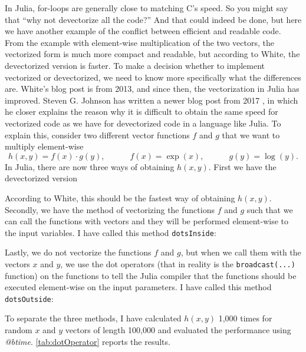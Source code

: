 In Julia, for-loops are generally close to matching C's speed. So you might say that \enquote{why not devectorize all the code?} And that could indeed be done, but here we have another example of the conflict between efficient and readable code. From the example with element-wise multiplication of the two vectors, the vectorized form is much more compact and readable, but according to White, the devectorized version is faster. To make a decision whether to implement vectorized or devectorized, we need to know more specifically what the differences are. White's blog post is from 2013, and since then, the vectorization in Julia has improved. Steven G. Johnson has written a newer blog post from 2017 \citep{MoreDotsJuliaBlog}, in which he closer explains the reason why it is difficult to obtain the same speed for vectorized code as we have for devectorized code in a language like Julia. To explain this, consider two different vector functions $f$ and $g$ that we want to multiply element-wise
\begin{equation*}
    h(x,y) = f(x) \cdot g(y), \hspace{3em} f(x) = \exp(x), \hspace{3em} g(y) = \log(y).
\end{equation*}
In Julia, there are now three ways of obtaining $h(x,y)$. First we have the devectorized version 

According to White, this should be the fastest way of obtaining $h(x,y)$. Secondly, we have the method of vectorizing the functions $f$ and $g$ such that we can call the functions with vectors and they will be performed element-wise to the input variables. I have called this method \texttt{dotsInside}:

Lastly, we do not vectorize the functions $f$ and $g$, but when we call them with the vectors $x$ and $y$, we use the dot operators (that in reality is the \texttt{broadcast(...)} function) on the functions to tell the Julia compiler that the functions should be executed element-wise on the input parameters. I have called this method \texttt{dotsOutside}:

To separate the three methods, I have calculated $h(x,y)$ 1,000 times for random $x$ and $y$ vectors of length 100,000 and evaluated the performance using \textit{@btime}. \autoref{tab:dotOperator} reports the results.

